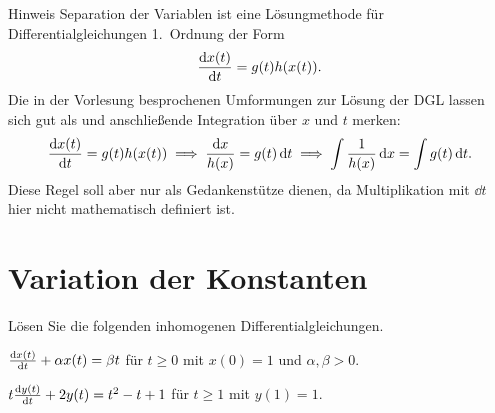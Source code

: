 \documentclass{scrartcl}
\begin{document}
\begin{remark}{Hinweis}
  Separation der Variablen ist eine Lösungmethode für Differentialgleichungen 1.\ Ordnung der Form
  \[
    \deriv[x(t)]{t} = g(t) h(x(t)).
  \]
  Die in der Vorlesung besprochenen Umformungen zur Lösung der DGL lassen sich gut als  und anschließende Integration über $x$ und $t$ merken:
    \[
    \deriv[x(t)]{t} = g(t) h(x(t)) \implies \frac{\dd x}{h(x)} = g(t) \, \dd t \implies \int \frac{1}{h(x)}\,  \dd x = \int g(t) \, \dd t.
  \]
  Diese Regel soll aber nur als Gedankenstütze dienen, da Multiplikation mit $\dd t$ hier nicht mathematisch definiert ist.
\end{remark}


\section{Variation der Konstanten }
\label{sec:variation_der_konstanten}

Lösen Sie die folgenden inhomogenen Differentialgleichungen.

\begin{subex}
  \item{} $\deriv[x(t)]{t} + \alpha x(t) = \beta t$ für $t \ge 0$ mit $x(0) = 1$ und $\alpha, \beta > 0$.
  \item{} $t \deriv[y(t)]{t} + 2 y(t) = t^2 - t + 1$ für $t \ge 1$ mit $y(1) = 1$.
\end{subex}
\end{document}
